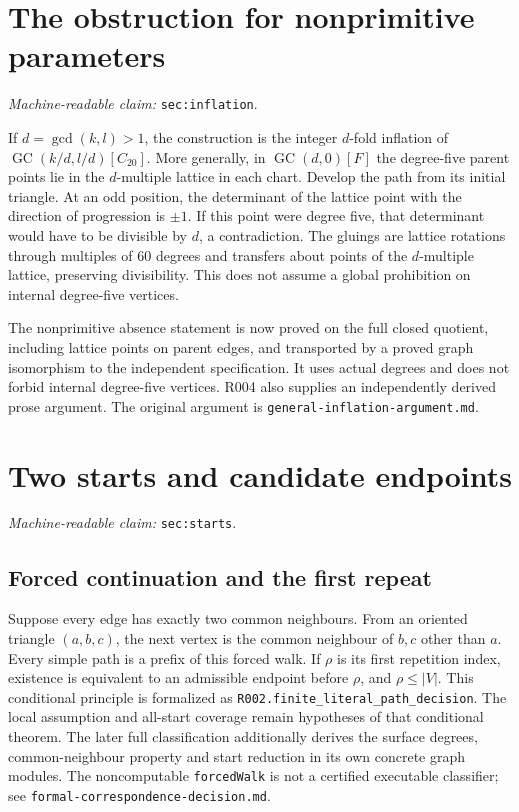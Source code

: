 \documentclass[11pt]{amsart}
\newcommand{\GC}{\operatorname{GC}}
\newcommand{\record}[1]{\nolinkurl{#1}}
\newcommand{\claimid}[1]{\par\nopagebreak\noindent\textit{Machine-readable claim:} \record{#1}.\par}
\begin{document}
\section{The obstruction for nonprimitive parameters}\label{sec:inflation}
\claimid{sec:inflation}
If $d=\gcd(k,l)>1$, the construction is the integer $d$-fold inflation
of $\GC(k/d,l/d)[C_{20}]$. More generally, in $\GC(d,0)[F]$ the
degree-five parent points lie in the $d$-multiple lattice in each chart.
Develop the path from its initial triangle. At an odd position, the
determinant of the lattice point with the direction of progression is
$\pm1$. If this point were degree five, that determinant would have to
be divisible by $d$, a contradiction. The gluings are lattice rotations
through multiples of $60$ degrees and transfers about points of the
$d$-multiple lattice, preserving divisibility. This does not assume a
global prohibition on internal degree-five vertices.

The nonprimitive absence statement is now proved on the full closed
quotient, including lattice points on parent edges, and transported by
a proved graph isomorphism to the independent specification. It uses
actual degrees and does not forbid internal degree-five vertices.
R004 also supplies an independently derived prose argument. The original argument is
\record{general-inflation-argument.md}.

\section{Two starts and candidate endpoints}\label{sec:starts}
\claimid{sec:starts}
\subsection{Forced continuation and the first repeat}
Suppose every edge has exactly two common neighbours. From an oriented
triangle $(a,b,c)$, the next vertex is the common neighbour of $b,c$
other than $a$. Every simple path is a prefix of this forced walk. If
$\rho$ is its first repetition index, existence is equivalent to an
admissible endpoint before $\rho$, and $\rho\le |V|$. This conditional
principle is formalized as \record{R002.finite_literal_path_decision}.
The local assumption and all-start coverage remain hypotheses of
that conditional theorem. The later full classification additionally
derives the surface degrees, common-neighbour property and start
reduction in its own concrete graph modules.
The noncomputable \record{forcedWalk} is not a certified executable
classifier; see \record{formal-correspondence-decision.md}.
\end{document}
